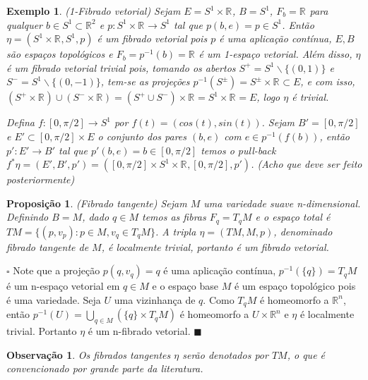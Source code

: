 \documentclass[12pt]{book}
\newtheorem{exemplo}[teorema]{Exemplo}
\newtheorem{observacao}[teorema]{Observação}
\newtheorem{proposicao}[teorema]{Proposição}
\newenvironment{prova}[1]{$\square$ #1}{\hfill$\blacksquare$}
\newcommand{\real}[1]{\mathbb{R}^{#1}}
\newcommand{\vermelho}[1]{{\color{red}#1}}
\begin{document}
	\begin{exemplo}
		(1-Fibrado vetorial) Sejam $E=S^{1} \times \real{}$, $B=S^{1}$, $F_{b} = \real{}$ para qualquer $b \in S^{1}\subset \real{2}$ e $p:S^{1} \times \real{}\to S^{1}$ tal que $p(b, e)=p \in S^{1}$. Então $\eta=(S^{1} \times \real{}, S^{1}, p)$ é um fibrado vetorial pois $p$ é uma aplicação contínua, $E, B$ são espaços topológicos e $F_{b} = p^{-1}(b) = \real{}$ é um 1-espaço vetorial. Além disso, $\eta$ é um fibrado vetorial trivial pois, tomando os abertos $S^{+} = S^{1} \backslash \{(0,1)\}$ e $S^{-} = S^{1} \backslash \{(0,-1)\}$, tem-se as projeções $p^{-1}(S^{\pm}) = S^{\pm} \times \real{} \subset E$, e com isso, $(S^{+}\times\real{}) \cup ( S^{-}\times\real{}) = (S^{+}\cup S^{-})\times\real{} = S^{1} \times\real{} =E$, logo $\eta$ é trivial. 
		
		\vermelho{
			Defina $f:[0,\pi/2] \to S^{1}$ por $f(t) = (cos(t), sin(t))$. Sejam $B' =[0,\pi/2]$ e $E' \subset [0,\pi/2]\times E$ o conjunto dos pares $(b, e)$ com $e \in p^{-1}(f(b))$, então $p': E'\to B'$ tal que $p'(b, e) = b \in [0,\pi/2]$ temos o pull-back $f^{*}\eta = (E', B', p') = ([0,\pi/2]\times S^{1}\times \real{}, [0,\pi/2], p')$. (Acho que deve ser feito posteriormente)}
	\end{exemplo}
	
	\begin{proposicao}
		(Fibrado tangente) Sejam $M$ uma variedade suave n-dimensional. Definindo $B=M$, dado $q\in M$ temos as fibras $F_{q} = T_{q}M$ e o espaço total é $TM=\{(p, v_{p}): p\in M, v_{q}\in T_{q}M \}$. A tripla $\eta = (TM, M, p)$, denominado fibrado tangente de $M$, é localmente trivial, portanto é um fibrado vetorial.
	\end{proposicao}
	\begin{prova}
		Note que a projeção $p(q,v_{q}) = q$ é uma aplicação contínua, $p^{-1}(\{q\}) = T_{q}M$ é um n-espaço vetorial em $q\in M$ e  o espaço base $M$ é um espaço topológico pois é uma variedade. Seja $U$ uma vizinhança de $q$. Como $T_{q}M$ é homeomorfo a $\real{n}$, então $p^{-1}(U) = \bigcup_{q\in M}(\{q\}\times T_{q}M)$ é homeomorfo a $U\times \real{n}$ e $\eta$ é localmente trivial. Portanto $\eta$ é um n-fibrado vetorial.
	\end{prova}
	
	\begin{observacao}
		Os fibrados tangentes $\eta$ serão denotados por $TM$, o que é convencionado por grande parte da literatura.
	\end{observacao}
	
\end{document}
